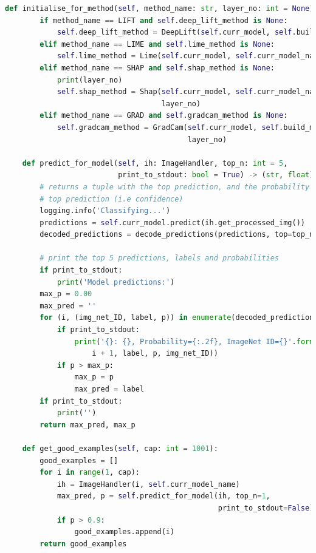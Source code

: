 \documentclass[main]{subfiles}
\begin{document}
\begin{lstlisting}[language=Python,basicstyle=\scriptsize]
    def initialise_for_method(self, method_name: str, layer_no: int = None):
        if method_name == LIFT and self.deep_lift_method is None:
            self.deep_lift_method = DeepLift(self.curr_model, self.build_model)
        elif method_name == LIME and self.lime_method is None:
            self.lime_method = Lime(self.curr_model, self.curr_model_name)
        elif method_name == SHAP and self.shap_method is None:
            print(layer_no)
            self.shap_method = Shap(self.curr_model, self.curr_model_name, 
                                    layer_no)
        elif method_name == GRAD and self.gradcam_method is None:
            self.gradcam_method = GradCam(self.curr_model, self.build_model, 
                                          layer_no)

    def predict_for_model(self, ih: ImageHandler, top_n: int = 5, 
                          print_to_stdout: bool = True) -> (str, float):
        # returns a tuple with the top prediction, and the probability of the 
        # top prediction (i.e confidence)
        logging.info('Classifying...')
        predictions = self.curr_model.predict(ih.get_processed_img())
        decoded_predictions = decode_predictions(predictions, top=top_n)

        # print the top 5 predictions, labels and probabilities
        if print_to_stdout:
            print('Model predictions:')
        max_p = 0.00
        max_pred = ''
        for (i, (img_net_ID, label, p)) in enumerate(decoded_predictions[0]):
            if print_to_stdout:
                print('{}: {}, Probability={:.2f}, ImageNet ID={}'.format(
                    i + 1, label, p, img_net_ID))
            if p > max_p:
                max_p = p
                max_pred = label
        if print_to_stdout:
            print('')
        return max_pred, max_p

    def get_good_examples(self, cap: int = 1001):
        good_examples = []
        for i in range(1, cap):
            ih = ImageHandler(i, self.curr_model_name)
            max_pred, p = self.predict_for_model(ih, top_n=1, 
                                                 print_to_stdout=False)
            if p > 0.9:
                good_examples.append(i)
        return good_examples

	\end{lstlisting}        
	\newpage
\end{document}
